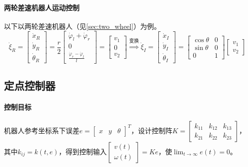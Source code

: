 \documentclass[
12pt, %
a4paper, 
oneside, %
headinclude,footinclude, %
]{scrartcl}
\begin{document}
\paragraph{两轮差速机器人运动控制}
以下以两轮差速机器人（见\ref{sec:two_wheel}）为例。
$$ 
\dot{\xi}_R = \begin{bmatrix} \dot{x}_R \\ \dot{y}_R \\ \dot{\theta}_R \end{bmatrix} = \frac{r}{2} \begin{bmatrix} \dot{\varphi}_l + \dot{\varphi}_r \\ 0 \\ \frac{\dot{\varphi}_r - \dot{\varphi}_l}{l} \end{bmatrix} = \begin{bmatrix} v_1 \\ 0 \\ v_2 \end{bmatrix} 
\overset{\text{变换}}{\Longrightarrow}
\dot{\xi}_I = \begin{bmatrix} \dot{x}_I \\ \dot{y}_I \\ \dot{\theta}_I \end{bmatrix} = \begin{bmatrix} \cos\theta & 0 \\ \sin\theta & 0 \\ 0 & 1 \end{bmatrix} \begin{bmatrix} v_1 \\ v_2 \end{bmatrix} 
$$
\subsection[定点控制器]{定点控制器}
\paragraph{控制目标}
机器人参考坐标系下误差$ e = \begin{bmatrix} x & y & \theta \end{bmatrix}^T $，设计控制阵$ K = \begin{bmatrix} k_{11} & k_{12} & k_{13} \\ k_{21} & k_{22} & k_{23} \end{bmatrix} $，其中$ k_{ij} = k(t, e) $，得到控制输入$ \begin{bmatrix} v(t) \\ \omega(t) \end{bmatrix} = Ke $，使$ \lim_{t \to \infty} e(t) = 0 $。
\end{document}
